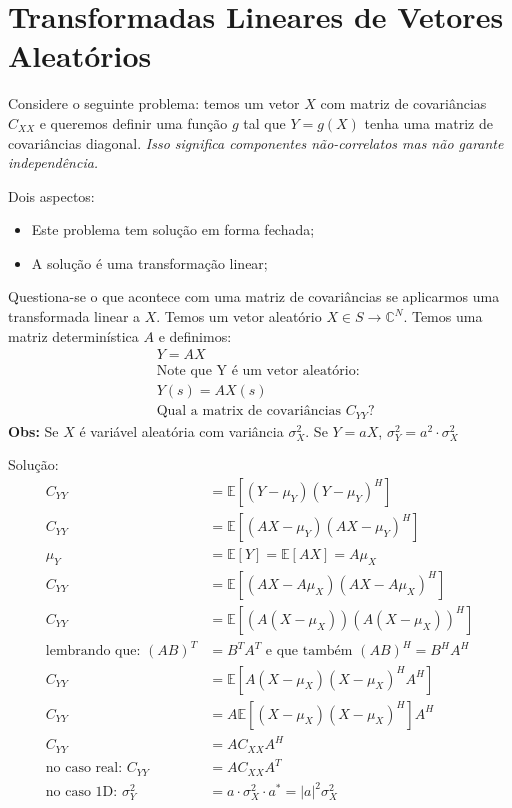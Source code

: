 \documentclass{article}
\renewcommand\bf[1]{\textbf{#1}}
\renewcommand\it[1]{\textit{#1}}
\begin{document}
\setlength{\abovedisplayskip}{12pt}
\setlength{\belowdisplayskip}{12pt}
\setlength{\abovedisplayshortskip}{0pt}
\setlength{\belowdisplayshortskip}{0pt}
\setlength{\jot}{1pt}

\section{Transformadas Lineares de Vetores Aleatórios}
Considere o seguinte problema: temos um vetor $X$ com matriz de covariâncias $C_{XX}$ e queremos
definir uma função $g$ tal que $Y = g(X)$ tenha uma matriz de covariâncias diagonal. \it{Isso
significa componentes não-correlatos mas não garante independência.}

Dois aspectos:
\begin{itemize}
    \item Este problema tem solução em forma fechada;
    \item A solução é uma transformação linear;
\end{itemize}

Questiona-se o que acontece com uma matriz de covariâncias se aplicarmos uma transformada linear a
$X$. Temos um vetor aleatório $X \in S \to \mathbb{C}^N$. Temos uma matriz determinística $A$ e
definimos:
\begin{align*}
    &Y = A X \\
      &\text{Note que Y é um vetor aleatório:} \\
      &Y(s) = A X(s) \\
         &\text{Qual a matrix de covariâncias } C_{YY}?
\end{align*}
\bf{Obs:} Se $X$ é variável aleatória com variância $\sigma_X^2$. Se $Y = aX$, $\sigma_Y^2 = a^2
\cdot \sigma_X^2$

Solução:
\begin{align*}
    C_{YY} &= \mathbb{E}[(Y-\mu_Y)(Y-\mu_Y)^H] \\
    C_{YY} &= \mathbb{E}[(AX-\mu_Y)(AX-\mu_Y)^H] \\
    \mu_Y &= \mathbb{E}[Y] = \mathbb{E}[AX] = A\mu_X \\
    C_{YY} &= \mathbb{E}[(AX-A\mu_X)(AX-A\mu_X)^H] \\
    C_{YY} &= \mathbb{E}[(A(X-\mu_X))(A(X-\mu_X))^H] \\
    \text{lembrando que: } (AB)^T &= B^TA^T \text{ e que também } (AB)^H = B^HA^H \\
    C_{YY} &= \mathbb{E}[A(X-\mu_X)(X-\mu_X)^HA^H] \\
    C_{YY} &= A\mathbb{E}[(X-\mu_X)(X-\mu_X)^H]A^H \\
    C_{YY} &= AC_{XX}A^H \\
    \text{no caso real: } C_{YY} &= AC_{XX}A^T \\
    \text{no caso 1D: } \sigma_Y^2 &= a \cdot \sigma_X^2 \cdot a^* = |a|^2 \sigma_X^2
\end{align*}
\end{document}
